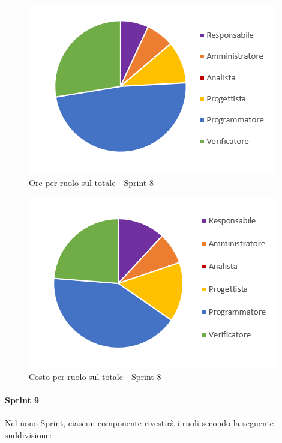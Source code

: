 \begin{figure}[H]
  \centering
  \includegraphics[scale=0.8]{immagini/8Sprint_oreRuolo.png}
  \caption{Ore per ruolo sul totale - Sprint 8}
\end{figure}

\begin{figure}[H]
  \centering
  \includegraphics[scale=0.8]{immagini/8Sprint_costoRuolo.png}
  \caption{Costo per ruolo sul totale - Sprint 8}
\end{figure}
\pagebreak

\paragraph{Sprint 9} \label{paragraph:preventivo_sprint9}
Nel nono Sprint\glo{}, ciascun componente rivestirà i ruoli secondo la seguente suddivisione:

